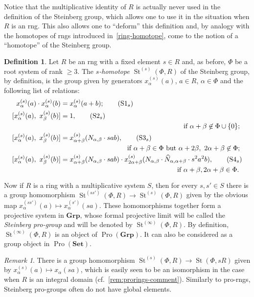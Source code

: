 \documentclass{article}
\numberwithin{equation}{section}
\theoremstyle{definition}
\newtheorem{df}[lemma]{Definition} \Crefname{df}{Definition}{Definitions}
\theoremstyle{remark}
\newtheorem{rem}[lemma]{Remark}
\DeclareMathOperator\St{St}
\DeclareMathOperator{\Pro}{Pro}
\newcommand{\Set}{\mathbf{Set}}
\newcommand{\Group}{\mathbf{Grp}}
\begin{document}
Notice that the multiplicative identity of $R$ is actually never used in the definition of the Steinberg group, 
 which allows one to use it in the situation when $R$ is an rng.
This also allows one to ``deform'' this definition and, by analogy with the homotopes of rngs introduced in~\cref{ring-homotope}, come to the notion of a ``homotope'' of the Steinberg group.
\begin{df}\label{def:Steinberg-homotope}
 Let $R$ be an rng with a fixed element $s \in R$ and, as before, $\Phi$ be a root system of rank $\geq 3$.
 The {\it $s$-homotope $\St^{(s)}(\Phi, R)$} of the Steinberg group, by definition, is the group given by generators $x_\alpha^{(s)}(a)$, $a\in R$, $\alpha\in\Phi$ and the following list of relations: \begin{align}
 x^{(s)}_\alpha(a) \cdot x^{(s)}_\alpha(b)    &= x^{(s)}_\alpha(a+b); \tag{S$1_s$} \label{S1} \\
 [x^{(s)}_\alpha(a),\ x^{(s)}_\beta(b)] &= 1, \tag{S$2_s$} \label{S2} \\ 
 \multispan2{\hfil if $\alpha + \beta \not\in\Phi \cup \{0\};$} \nonumber \\
 [x^{(s)}_\alpha(a),\ x^{(s)}_\beta(b)] &= x^{(s)}_{\alpha + \beta}(N_{\alpha,\beta} \cdot sab), \tag{S$3_s$} \label{S3} \\
 \multispan2{\hfill if $\alpha+\beta\in\Phi$ but $\alpha+2\beta,\ 2\alpha+\beta\not\in\Phi;$} \nonumber \\
 [x^{(s)}_\alpha(a),\ x^{(s)}_\beta(b)] &= x^{(s)}_{\alpha + \beta}(N_{\alpha,\beta} \cdot sab) \cdot x^{(s)}_{2\alpha+\beta}(N_{\alpha,\beta} \cdot \widehat{N}_{\alpha, \alpha+\beta}\cdot s^2a^2b), \tag{S$4_s$} \label{S4} \\ \multispan2{ \hfill if $\alpha+\beta,2\alpha+\beta\in\Phi$.} \nonumber  \end{align} 
 
 Now if $R$ is a ring with a multiplicative system $S$, then for every $s, s' \in S$ there is a group homomorphism $\St^{(ss')}(\Phi, R) \to \St^{(s)}(\Phi, R)$ given by the obvious map $x_\alpha^{(ss')}(a) \mapsto x_\alpha^{(s')}(sa)$.
 These homomorphisms together form a projective system in $\Group$, whose formal projective limit will be called the {\it Steinberg pro-group} and will be denoted by $\St^{(\infty)}(\Phi, R)$.
 By definition, $\St^{(\infty)}(\Phi, R)$ is an object of $\Pro(\Group)$. It can also be considered as a group object in $\Pro(\Set)$. 
\end{df}

\begin{rem} \label{rem:pro-Steinberg-comment}
There is a group homomorphism $\St^{(s)}(\Phi, R) \to \St(\Phi, sR)$ given by $x_\alpha^{(s)}(a)\mapsto x_\alpha(sa)$, which is easily seen to be an isomorphism in the case when $R$ is an integral domain (cf.~\cref{rem:prorings-comment}). Similarly to pro-rngs, Steinberg pro-groups often do not have global elements.
\end{rem}
 
\end{document}
